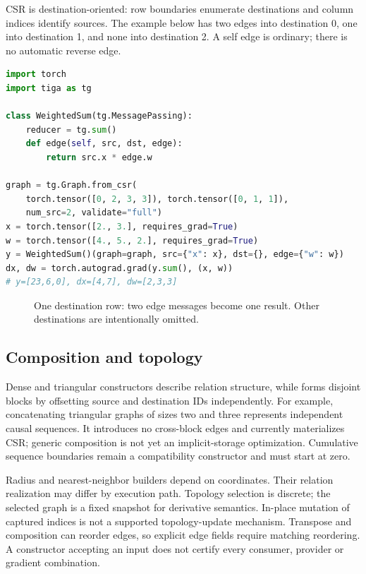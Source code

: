 CSR is destination-oriented: row boundaries enumerate destinations and column
indices identify sources. The example below has two edges into destination 0,
one into destination 1, and none into destination 2. A self edge is ordinary;
there is no automatic reverse edge.
\noindent\begin{minipage}{\linewidth}
\begin{lstlisting}[language=Python]
import torch
import tiga as tg

class WeightedSum(tg.MessagePassing):
    reducer = tg.sum()
    def edge(self, src, dst, edge):
        return src.x * edge.w

graph = tg.Graph.from_csr(
    torch.tensor([0, 2, 3, 3]), torch.tensor([0, 1, 1]),
    num_src=2, validate="full")
x = torch.tensor([2., 3.], requires_grad=True)
w = torch.tensor([4., 5., 2.], requires_grad=True)
y = WeightedSum()(graph=graph, src={"x": x}, dst={}, edge={"w": w})
dx, dw = torch.autograd.grad(y.sum(), (x, w))
# y=[23,6,0], dx=[4,7], dw=[2,3,3]
\end{lstlisting}
\end{minipage}

\begin{figure}[ht]
\centering
{}
\caption{One destination row: two edge messages become one result. Other
destinations are intentionally omitted.}
\end{figure}

\subsection{Composition and topology}
Dense and triangular constructors describe relation structure, while
 forms disjoint blocks by offsetting source and destination
IDs independently. For example, concatenating triangular graphs of sizes two
and three represents independent causal sequences. It introduces no cross-block
edges and currently materializes CSR; generic composition is not yet an
implicit-storage optimization. Cumulative sequence boundaries remain a
compatibility constructor and must start at zero.

Radius and nearest-neighbor builders depend on coordinates. Their relation
realization may differ by execution path. Topology selection is discrete;
the selected graph is a fixed snapshot for derivative semantics. In-place
mutation of captured indices is not a supported topology-update mechanism.
Transpose and composition can reorder edges, so explicit edge fields require
matching reordering. A constructor accepting an input does not certify every
consumer, provider or gradient combination.
